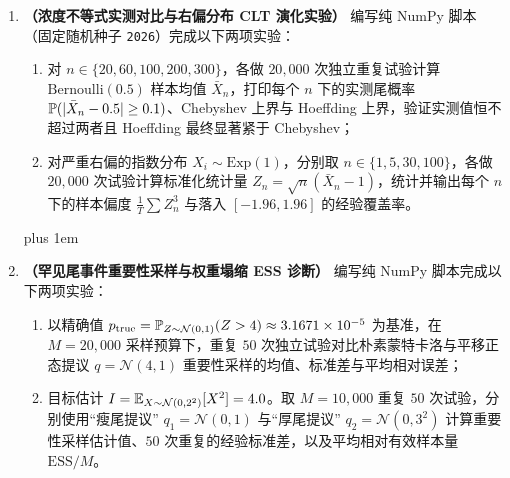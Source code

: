 \begin{enumerate}[label=\textbf{3.\arabic*}, leftmargin=2.4em, resume]
  \item \textbf{（浓度不等式实测对比与右偏分布 CLT 演化实验）} 编写纯 NumPy 脚本（固定随机种子 \texttt{2026}）完成以下两项实验：
  \begin{enumerate}[label=(\arabic*), leftmargin=1.8em]
    \item 对 $n \in \{20, 60, 100, 200, 300\}$，各做 $20{,}000$ 次独立重复试验计算 $\mathrm{Bernoulli}(0.5)$ 样本均值 $\bar{X}_n$，打印每个 $n$ 下的实测尾概率 $\mathbb{P}(|\bar{X}_n - 0.5| \ge 0.1)$、Chebyshev 上界与 Hoeffding 上界，验证实测值恒不超过两者且 Hoeffding 最终显著紧于 Chebyshev；
    \item 对严重右偏的指数分布 $X_i \sim \mathrm{Exp}(1)$，分别取 $n \in \{1, 5, 30, 100\}$，各做 $20{,}000$ 次试验计算标准化统计量 $Z_n = \sqrt{n}(\bar{X}_n - 1)$，统计并输出每个 $n$ 下的样本偏度 $\frac{1}{T}\sum Z_n^3$ 与落入 $[-1.96, 1.96]$ 的经验覆盖率。
  \end{enumerate}
  {\rightskip=0pt plus 1em\relax \par\smallskip{}\par}

  \item \textbf{（罕见尾事件重要性采样与权重塌缩 ESS 诊断）} 编写纯 NumPy 脚本完成以下两项实验：
  \begin{enumerate}[label=(\arabic*), leftmargin=1.8em]
    \item 以精确值 $p_{\mathrm{true}} = \mathbb{P}_{Z\sim\mathcal{N}(0,1)}(Z > 4) \approx 3.1671 \times 10^{-5}$ 为基准，在 $M = 20{,}000$ 采样预算下，重复 $50$ 次独立试验对比朴素蒙特卡洛与平移正态提议 $q = \mathcal{N}(4, 1)$ 重要性采样的均值、标准差与平均相对误差；
    \item 目标估计 $I = \mathbb{E}_{X\sim\mathcal{N}(0, 2^2)}[X^2] = 4.0$。取 $M = 10{,}000$ 重复 $50$ 次试验，分别使用“瘦尾提议” $q_1 = \mathcal{N}(0, 1)$ 与“厚尾提议” $q_2 = \mathcal{N}(0, 3^2)$ 计算重要性采样估计值、$50$ 次重复的经验标准差，以及平均相对有效样本量 $\mathrm{ESS}/M$。
  \end{enumerate}
  \par\smallskip{}
\end{enumerate}
